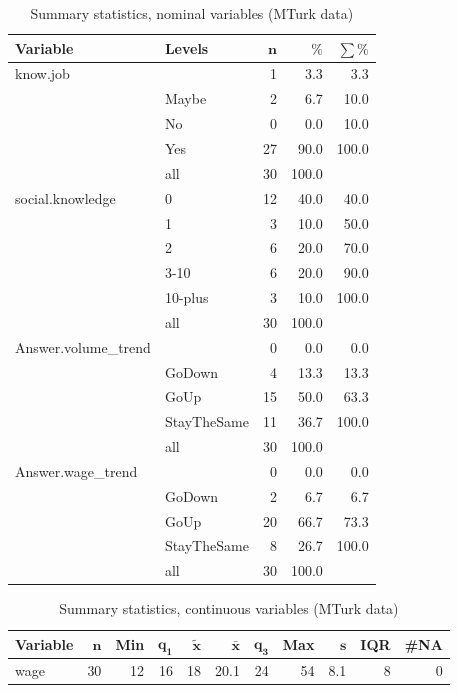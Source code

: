 \documentclass[a4paper,10pt]{article}\usepackage[]{graphicx}\usepackage[]{color}
\begin{document}
\begin{table}[ht]
\centering
{\footnotesize
\begin{tabular}{ll|rrr}
 \textbf{Variable} & \textbf{Levels} & $\mathbf{n}$ & $\mathbf{\%}$ & $\mathbf{\sum \%}$ \\ 
  \hline
know.job &  & 1 & 3.3 & 3.3 \\ 
   & Maybe & 2 & 6.7 & 10.0 \\ 
   & No & 0 & 0.0 & 10.0 \\ 
   & Yes & 27 & 90.0 & 100.0 \\ 
   \hline
 & all & 30 & 100.0 &  \\ 
   \hline
\hline
social.knowledge & 0 & 12 & 40.0 & 40.0 \\ 
   & 1 & 3 & 10.0 & 50.0 \\ 
   & 2 & 6 & 20.0 & 70.0 \\ 
   & 3-10 & 6 & 20.0 & 90.0 \\ 
   & 10-plus & 3 & 10.0 & 100.0 \\ 
   \hline
 & all & 30 & 100.0 &  \\ 
   \hline
\hline
Answer.volume\_trend &  & 0 & 0.0 & 0.0 \\ 
   & GoDown & 4 & 13.3 & 13.3 \\ 
   & GoUp & 15 & 50.0 & 63.3 \\ 
   & StayTheSame & 11 & 36.7 & 100.0 \\ 
   \hline
 & all & 30 & 100.0 &  \\ 
   \hline
\hline
Answer.wage\_trend &  & 0 & 0.0 & 0.0 \\ 
   & GoDown & 2 & 6.7 & 6.7 \\ 
   & GoUp & 20 & 66.7 & 73.3 \\ 
   & StayTheSame & 8 & 26.7 & 100.0 \\ 
   \hline
 & all & 30 & 100.0 &  \\ 
   \hline
\hline
\end{tabular}
}
\caption{Summary statistics, nominal variables (MTurk data)} 
\label{tab1:25-2030}
\end{table}
\begin{table}[ht]
\centering
{\footnotesize
\begin{tabular}{lrrrrrrrrrr}
 \textbf{Variable} & $\mathbf{n}$ & \textbf{Min} & $\mathbf{q_1}$ & $\mathbf{\widetilde{x}}$ & $\mathbf{\bar{x}}$ & $\mathbf{q_3}$ & \textbf{Max} & $\mathbf{s}$ & \textbf{IQR} & \textbf{\#NA} \\ 
  \hline
wage & 30 & 12 & 16 & 18 & 20.1 & 24 & 54 & 8.1 & 8 & 0 \\ 
  \end{tabular}
}
\caption{Summary statistics, continuous variables (MTurk data)} 
\label{tab2:25-2030}
\end{table}
\end{document}
